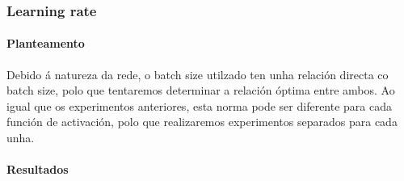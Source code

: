 \subsubsection{Learning rate}
\label{subsubsec:Learning rate}

\paragraph{Planteamento}
\label{par:Planteamento}

Debido á natureza da rede, o batch size utilzado ten unha relación directa co batch size, polo que tentaremos determinar a relación óptima entre ambos.
Ao igual que os experimentos anteriores, esta norma pode ser diferente para cada función de activación, polo que realizaremos experimentos separados para cada unha.

\paragraph{Resultados}
\label{par:Resultados}

